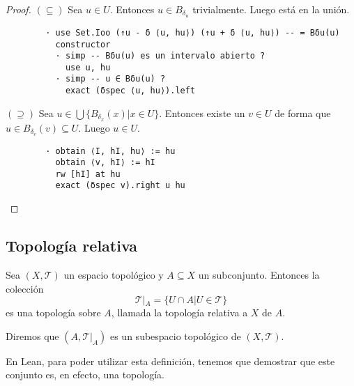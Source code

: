 \begin{proof}
  $(\subseteq)$ Sea $u \in U$. Entonces $u \in B_{\delta_u}$ trivialmente. Luego está en la unión.

  \begin{lstlisting}
        · use Set.Ioo (↑u - δ ⟨u, hu⟩) (↑u + δ ⟨u, hu⟩) -- = Bδu(u)
          constructor
          · simp -- Bδu(u) es un intervalo abierto ?
            use u, hu
          · simp -- u ∈ Bδu(u) ?
            exact (δspec ⟨u, hu⟩).left \end{lstlisting}

  $(\supseteq)$ Sea $u \in \bigcup \{B_{\delta_x}(x) | x \in U\}$. Entonces existe un $v \in U$ de forma que $u \in B_{\delta_v}(v) \subseteq U$. Luego $u \in U$.

  \begin{lstlisting}
        · obtain ⟨I, hI, hu⟩ := hu
          obtain ⟨v, hI⟩ := hI
          rw [hI] at hu
          exact (δspec v).right u hu \end{lstlisting}
  
\end{proof}

\subsection{Topología relativa}

\begin{definition}
  Sea $(X, \mathcal{T})$ un espacio topológico y $A \subseteq X$ un subconjunto. Entonces la colección
  $$
  \mathcal{T}|_A = \{U \cap A | U \in \mathcal{T}\}
  $$
  es una topología sobre $A$, llamada la \textnormal{topología relativa} a $X$ de $A$.

  Diremos que $(A, \mathcal{T}|_A)$ es un \textnormal{subespacio topológico} de $(X, \mathcal{T})$.
\end{definition}

En Lean, para poder utilizar esta definición, tenemos que demostrar que este conjunto es, en efecto, una topología.

